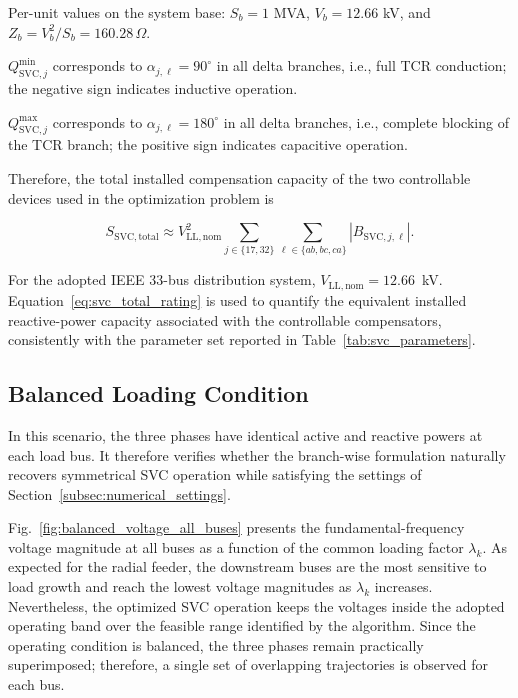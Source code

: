 \documentclass[journal]{IEEEtran}
\begin{document}
\begin{table}[htbp]
\begin{threeparttable}
\begin{tablenotes}
\footnotesize
\item[a] Per-unit values on the system base: $S_b=1$ MVA, $V_b=12.66$ kV, and $Z_b=V_b^2/S_b=160.28\,\Omega$.
\item[b] $Q_{\mathrm{SVC},j}^{\min}$ corresponds to $\alpha_{j,\ell}=90^\circ$ in all delta branches, i.e., full TCR conduction; the negative sign indicates inductive operation.
\item[c] $Q_{\mathrm{SVC},j}^{\max}$ corresponds to $\alpha_{j,\ell}=180^\circ$ in all delta branches, i.e., complete blocking of the TCR branch; the positive sign indicates capacitive operation.
\end{tablenotes}
\end{threeparttable}
\end{table}

\noindent Therefore, the total installed compensation capacity of the two
controllable devices used in the optimization problem is

\begin{equation}
    S_{\mathrm{SVC,total}} \approx
    V_{\mathrm{LL,nom}}^2
    \sum_{j \in \{17,32\}} \sum_{\ell \in \{ab,bc,ca\}}
    \left|B_{\mathrm{SVC},j,\ell}\right|.
    \label{eq:svc_total_rating}
\end{equation}



\noindent For the adopted IEEE 33-bus distribution system,
$V_{\mathrm{LL,nom}} = 12.66$~kV. Equation~\eqref{eq:svc_total_rating} is
used to quantify the equivalent installed reactive-power capacity
associated with the controllable compensators, consistently with the
parameter set reported in Table~\ref{tab:svc_parameters}.

\subsection{Balanced Loading Condition}
\label{subsec:balanced_results}
In this scenario, the three phases have identical active and reactive powers
at each load bus. It therefore verifies whether the branch-wise formulation
naturally recovers symmetrical SVC operation while satisfying the settings of
Section~\ref{subsec:numerical_settings}.

Fig.~\ref{fig:balanced_voltage_all_buses} presents the fundamental-frequency
voltage magnitude at all buses as a function of the common loading factor
$\lambda_k$. As expected for the radial feeder, the downstream buses are the
most sensitive to load growth and reach the lowest voltage magnitudes as
$\lambda_k$ increases. Nevertheless, the optimized SVC operation keeps the
voltages inside the adopted operating band over the feasible range identified
by the algorithm. Since the operating condition is balanced, the three phases
remain practically superimposed; therefore, a single set of overlapping
trajectories is observed for each bus.
\end{document}
